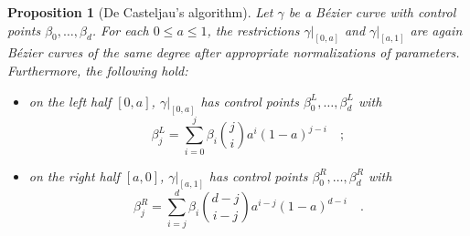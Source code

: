 \documentclass[pdftex,a4paper,12pt]{scrartcl}
\theoremstyle{plain}
\newtheorem{proposition}[theorem]{Proposition}
\theoremstyle{definition}
\theoremstyle{remark}
\numberwithin{equation}{section}
\begin{document}
\begin{proposition}[De Casteljau's algorithm]
\label{prop:de-casteljau}
Let $\gamma$ be a B\'ezier curve with control points $\beta_0,\dots,\beta_d$.
For each $0\le a\le 1$, the restrictions $\left.\gamma\right|_{[0,a]}$ and $\left.\gamma\right|_{[a,1]}$ are again B\'ezier curves of the same degree after appropriate normalizations of parameters.
Furthermore, the following hold:
\begin{itemize}
  \item on the left half $[0,a]$, $\left.\gamma\right|_{[0,a]}$ has control points $\beta^L_0,\dots,\beta^L_d$ with
\[
\beta^L_j = \sum_{i=0}^j\beta_i\binom{j}{i}a^i(1-a)^{j-i}
\quad;
\]
  \item on the right half $[a,0]$, $\left.\gamma\right|_{[a,1]}$ has control points $\beta^R_0,\dots,\beta^R_d$ with
\[
\beta^R_j = \sum_{i=j}^d\beta_i\binom{d-j}{i-j}a^{i-j}(1-a)^{d-i}
\quad.
\]
\end{itemize}
\end{proposition}
\end{document}

